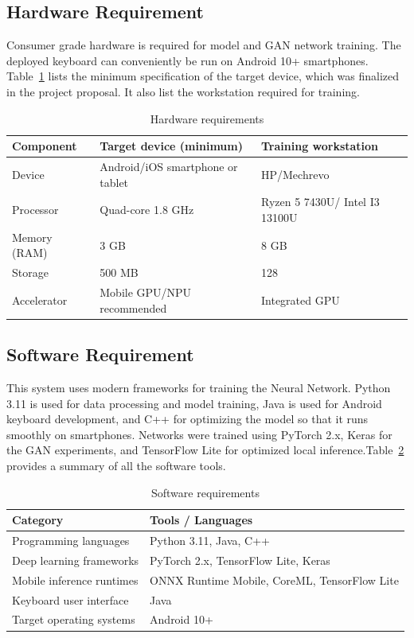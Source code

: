\documentclass[12pt,a4paper]{report}
\begin{document}
\subsection{Hardware Requirement}
Consumer grade hardware is required for model and GAN network training. The deployed keyboard can conveniently be run on Android 10+ smartphones. Table~\ref{tab:hw} lists the minimum specification of the target device, which was finalized in the project proposal. It also list the workstation required for training.

\begin{table}[H]
\caption{Hardware requirements}\label{tab:hw}
\centering\renewcommand{\arraystretch}{1.2}
\begin{tabular}{|p{1.5in}|p{2.2in}|p{1.7in}|}
\hline
\textbf{Component} & \textbf{Target device (minimum)} & \textbf{Training workstation}\\\hline
Device & Android/iOS smartphone or tablet & HP/Mechrevo\\\hline
Processor & Quad-core 1.8 GHz & Ryzen 5 7430U/ Intel I3 13100U\\\hline
Memory (RAM) & 3 GB & 8 GB\\\hline
Storage & 500 MB & 128\\\hline
Accelerator & Mobile GPU/NPU recommended & Integrated GPU\\\hline
\end{tabular}
\end{table}

\subsection{Software Requirement}
This system uses modern frameworks for training the Neural Network. Python 3.11 is used for data processing and model training, Java is used for Android keyboard development, and C++ for optimizing the model so that it runs smoothly on smartphones. Networks were trained using PyTorch 2.x, Keras for the GAN experiments, and TensorFlow Lite for optimized local inference.Table~\ref{tab:sw} provides a summary of all the software tools.

\begin{table}[H]
\caption{Software requirements}\label{tab:sw}
\centering\renewcommand{\arraystretch}{1.2}
\begin{tabular}{|p{1.9in}|p{3.6in}|}
\hline
\textbf{Category} & \textbf{Tools / Languages}\\\hline
Programming languages & Python 3.11, Java, C++\\\hline
Deep learning frameworks & PyTorch 2.x, TensorFlow Lite, Keras\\\hline
Mobile inference runtimes & ONNX Runtime Mobile, CoreML, TensorFlow Lite\\\hline
Keyboard user interface & Java\\\hline
Target operating systems & Android 10+ \\\hline
\end{tabular}
\end{table}
\end{document}
